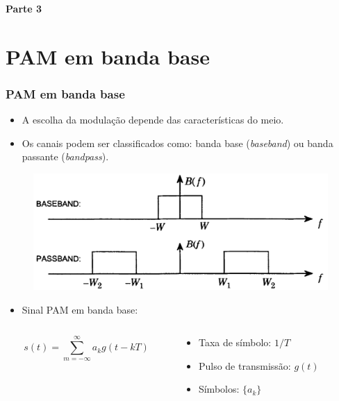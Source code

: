 
\begin{frame}
	\begin{block}{\centering\large\bfseries Parte 3}
		\centering\large\insertpart
	\end{block}
\end{frame}


\section{PAM em banda base}

\begin{frame}
	\frametitle{PAM em banda base}

	\begin{itemize}
	    \item A escolha da modulação depende das características do meio.
	    \item Os canais podem ser classificados como: banda base (\textit{baseband}) ou banda passante (\textit{bandpass}).	\vspace{-0.3cm}  
	\end{itemize}	
	\begin{figure}[t]	
	  \begin{center}
	    \includegraphics[width=0.5\columnwidth]{figs/pam_01}
	  \end{center}
	\end{figure}
	\vspace{-0.3cm}
	\begin{itemize}
	    \item Sinal PAM em banda base:\vspace{-0.3cm}
	\end{itemize}
	\begin{columns}
		\begin{column}{0.5\textwidth}
		    \begin{equation*}
			s(t) = \sum\limits_{m=-\infty}^{\infty} a_k g(t-kT)
		    \end{equation*}
		\end{column}
		\begin{column}{0.5\textwidth}
		    \begin{itemize}
			\item Taxa de símbolo: $1/T$
			\item Pulso de transmissão: $g(t)$
			\item Símbolos: $\{a_k\}$
		    \end{itemize}
		\end{column}
	\end{columns}	
\end{frame}

